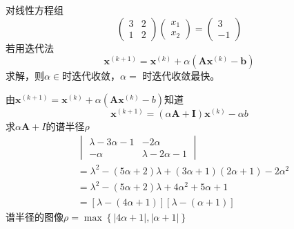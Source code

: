 \begin{example}
    对线性方程组
    \[
        \begin{pmatrix}3&2\\1&2\end{pmatrix}\begin{pmatrix}x_1\\x_2\end{pmatrix}=\begin{pmatrix}3\\-1\end{pmatrix}
    \]
    若用迭代法
    \[
        \boldsymbol{x}^{(k+1)}=\boldsymbol{x}^{(k)}+\alpha(\boldsymbol{A}\boldsymbol{x}^{(k)}-\boldsymbol{b})
    \]
    求解，则$\alpha\in$时迭代收敛，$\alpha=$ 时迭代收敛最快。
    \begin{solution}
        由$\boldsymbol{x}^{(k+1)}=\boldsymbol{x}^{(k)}+\alpha(\boldsymbol{A}\boldsymbol{x}^{(k)}-b)$知道
        \[
            \boldsymbol{x}^{(k+1)}=(\alpha \boldsymbol{A}+\boldsymbol{I})\boldsymbol{x}^{(k)}-\alpha b
        \]
        求$\alpha \boldsymbol{A}+I$的谱半径$\rho$
        \[
            \begin{aligned}
                &\begin{vmatrix}
                    \lambda-3\alpha-1 & -2\alpha\\
                    -\alpha & \lambda-2\alpha-1
                \end{vmatrix}\\
                &=\lambda^2-(5\alpha+2)\lambda+(3\alpha+1)(2\alpha+1)-2\alpha^2\\
                &=\lambda^2-(5\alpha+2)\lambda+4\alpha^2+5\alpha+1\\
                &=[\lambda-(4\alpha+1)][\lambda-(\alpha+1)]
            \end{aligned}
        \]
        谱半径的图像$\rho = \max\left\{ |4\alpha+1|,|\alpha+1| \right\}$
        \begin{figure}[ht]
            \centering

\end{figure}
\end{solution}
\end{example}
